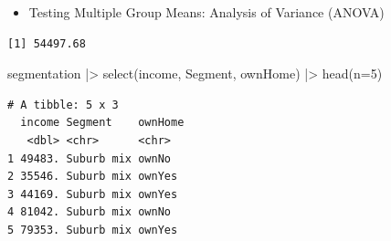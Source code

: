 \documentclass[
  ignorenonframetext,
]{beamer}
\newenvironment{Shaded}{\begin{snugshade}}{\end{snugshade}}
\newcommand{\AttributeTok}[1]{\textcolor[rgb]{0.40,0.45,0.13}{#1}}
\newcommand{\DecValTok}[1]{\textcolor[rgb]{0.68,0.00,0.00}{#1}}
\newcommand{\FunctionTok}[1]{\textcolor[rgb]{0.28,0.35,0.67}{#1}}
\newcommand{\NormalTok}[1]{\textcolor[rgb]{0.00,0.23,0.31}{#1}}
\newcommand{\OtherTok}[1]{\textcolor[rgb]{0.00,0.23,0.31}{#1}}
\newcommand{\SpecialCharTok}[1]{\textcolor[rgb]{0.37,0.37,0.37}{#1}}
\providecommand{\tightlist}{%
  \setlength{\itemsep}{0pt}\setlength{\parskip}{0pt}}\usepackage{longtable,booktabs,array}
\begin{document}
\begin{frame}[fragile]{}
\label{section-30}
\begin{itemize}
\tightlist
\item
  Testing Multiple Group Means: Analysis of Variance (ANOVA)
\end{itemize}

\tiny

\begin{Shaded}
\end{Shaded}

\begin{verbatim}
[1] 54497.68
\end{verbatim}

\begin{Shaded}
\begin{Highlighting}[]
\NormalTok{segmentation }\SpecialCharTok{|\textgreater{}} 
  \FunctionTok{select}\NormalTok{(income, Segment, ownHome) }\SpecialCharTok{|\textgreater{}} 
  \FunctionTok{head}\NormalTok{(}\AttributeTok{n=}\DecValTok{5}\NormalTok{)}
\end{Highlighting}
\end{Shaded}

\begin{verbatim}
# A tibble: 5 x 3
  income Segment    ownHome
   <dbl> <chr>      <chr>  
1 49483. Suburb mix ownNo  
2 35546. Suburb mix ownYes 
3 44169. Suburb mix ownYes 
4 81042. Suburb mix ownNo  
5 79353. Suburb mix ownYes 
\end{verbatim}
\end{frame}
\end{document}
